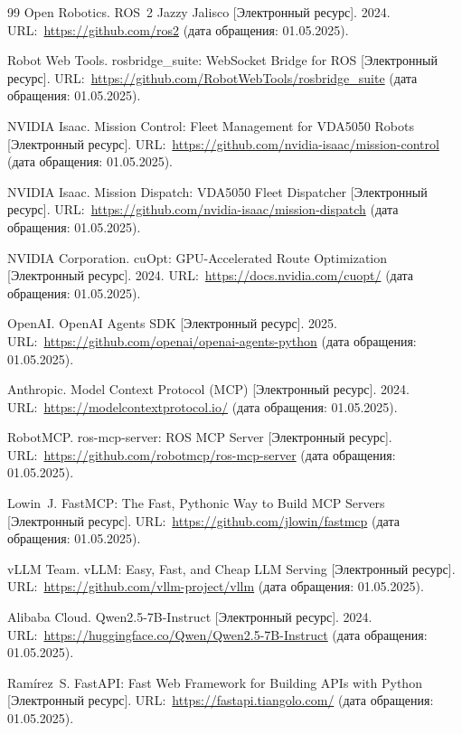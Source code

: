 \documentclass[14pt,a4paper]{extreport}
\begin{document}
\begin{thebibliography}{99}
Open Robotics. ROS~2 Jazzy Jalisco [Электронный ресурс]. 2024. URL:~\url{https://github.com/ros2} (дата обращения: 01.05.2025).

Robot Web Tools. rosbridge\_suite: WebSocket Bridge for ROS [Электронный ресурс]. URL:~\url{https://github.com/RobotWebTools/rosbridge_suite} (дата обращения: 01.05.2025).

NVIDIA Isaac. Mission Control: Fleet Management for VDA5050 Robots [Электронный ресурс]. URL:~\url{https://github.com/nvidia-isaac/mission-control} (дата обращения: 01.05.2025).

NVIDIA Isaac. Mission Dispatch: VDA5050 Fleet Dispatcher [Электронный ресурс]. URL:~\url{https://github.com/nvidia-isaac/mission-dispatch} (дата обращения: 01.05.2025).

NVIDIA Corporation. cuOpt: GPU-Accelerated Route Optimization [Электронный ресурс]. 2024. URL:~\url{https://docs.nvidia.com/cuopt/} (дата обращения: 01.05.2025).

OpenAI. OpenAI Agents SDK [Электронный ресурс]. 2025. URL:~\url{https://github.com/openai/openai-agents-python} (дата обращения: 01.05.2025).

Anthropic. Model Context Protocol (MCP) [Электронный ресурс]. 2024. URL:~\url{https://modelcontextprotocol.io/} (дата обращения: 01.05.2025).

RobotMCP. ros-mcp-server: ROS MCP Server [Электронный ресурс]. URL:~\url{https://github.com/robotmcp/ros-mcp-server} (дата обращения: 01.05.2025).

Lowin~J. FastMCP: The Fast, Pythonic Way to Build MCP Servers [Электронный ресурс]. URL:~\url{https://github.com/jlowin/fastmcp} (дата обращения: 01.05.2025).

vLLM Team. vLLM: Easy, Fast, and Cheap LLM Serving [Электронный ресурс]. URL:~\url{https://github.com/vllm-project/vllm} (дата обращения: 01.05.2025).

Alibaba Cloud. Qwen2.5-7B-Instruct [Электронный ресурс]. 2024. URL:~\url{https://huggingface.co/Qwen/Qwen2.5-7B-Instruct} (дата обращения: 01.05.2025).

Ramírez~S. FastAPI: Fast Web Framework for Building APIs with Python [Электронный ресурс]. URL:~\url{https://fastapi.tiangolo.com/} (дата обращения: 01.05.2025).


\end{thebibliography}
\end{document}

